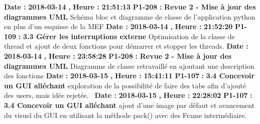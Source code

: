 \documentclass{article}%
\begin{document}
\newline%
%
\textbf{Date : }%
\textbf{2018{-}03{-}14}%
\textbf{,}%
\textbf{ Heure : }%
\textbf{21:51:13}%
\newline%
%
\textbf{P1{-}208 }%
\textbf{ : }%
\textbf{ Revue 2 {-} Mise à jour des diagrammes UML}%
\newline%
\newline%
%
Schéma bloc et diagramme de classe de l'application python en plus d'un esquisse de la MEF\newline%
\newline%
%
\textbf{Date : }%
\textbf{2018{-}03{-}14}%
\textbf{,}%
\textbf{ Heure : }%
\textbf{21:52:20}%
\newline%
%
\textbf{P1{-}109 }%
\textbf{ : }%
\textbf{ 3.3 Gérer les interruptions externe }%
\newline%
\newline%
%
Optimisation de la classe de thread et ajout de deux fonctions pour démarrer et stopper les threads.\newline%
\newline%
%
\textbf{Date : }%
\textbf{2018{-}03{-}14}%
\textbf{,}%
\textbf{ Heure : }%
\textbf{23:58:28}%
\newline%
%
\textbf{P1{-}208 }%
\textbf{ : }%
\textbf{ Revue 2 {-} Mise à jour des diagrammes UML}%
\newline%
\newline%
%
Diagramme de classe retravaillé en ajoutant une description des fonctions\newline%
\newline%
%
\textbf{Date : }%
\textbf{2018{-}03{-}15}%
\textbf{,}%
\textbf{ Heure : }%
\textbf{15:41:11}%
\newline%
%
\textbf{P1{-}107 }%
\textbf{ : }%
\textbf{ 3.4 Concevoir un GUI alléchant}%
\newline%
\newline%
%
exploration de la possibilité de faire des tabs afin d'ajouté des users, mais idée rejetée.~\newline%
\newline%
%
\textbf{Date : }%
\textbf{2018{-}03{-}15}%
\textbf{,}%
\textbf{ Heure : }%
\textbf{22:28:02}%
\newline%
%
\textbf{P1{-}107 }%
\textbf{ : }%
\textbf{ 3.4 Concevoir un GUI alléchant}%
\newline%
\newline%
%
ajout d'une image par défaut et avancement du visuel du GUI en utilisant la méthode pack() avec des Frame intermédiaire.~\newline%
\end{document}
